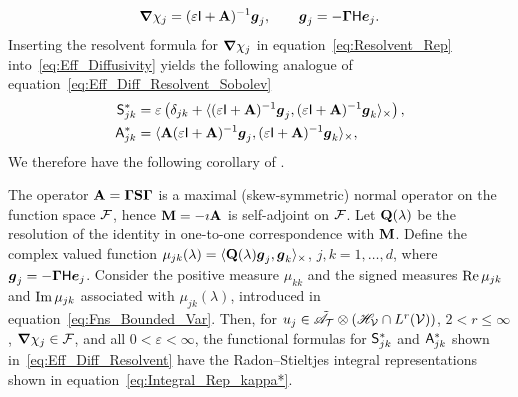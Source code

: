 \documentclass[amsa]{ipart}
\begin{document}
% 
\begin{align}\label{eq:Resolvent_Rep}
  \bnabla \chi_j=(\varepsilon\Ib+\Ab)^{-1}\vecg_j,
  \qquad
  \vecg_j=-\bGamma\Hm\vece_j.
\end{align}
%
Inserting the resolvent formula for
$\mbox{\boldmath${\nabla}$}\chi_j$ in equation~\eqref{eq:Resolvent_Rep}
into~\eqref{eq:Eff_Diffusivity} yields the following analogue 
of equation~\eqref{eq:Eff_Diff_Resolvent_Sobolev} 
%
\begin{align}\label{eq:Eff_Diff_Resolvent}
 \Sm^*_{jk}&=\varepsilon\left(\delta_{jk}+\langle(\varepsilon\Ib+\Ab)^{-1}\vecg_j,(\varepsilon\Ib+\Ab)^{-1}\vecg_k\rangle_\times\right),
 \\
 \Am^*_{jk}&=\langle\Ab(\varepsilon\Ib+\Ab)^{-1}\vecg_j,(\varepsilon\Ib+\Ab)^{-1}\vecg_k\rangle_\times,
 \notag
\end{align}
%
We therefore have the following corollary of .
%
\begin{corollary}\label{cor:Integral_Reps}
  The operator $\mathbf{A}=\mbox{\boldmath${\Gamma}$}\mathbf{S}\mbox{\boldmath${\Gamma}$}$ is a maximal (skew-symmetric)
  normal operator on the function space $\mathcal{F}$, hence $\mathbf{M}=-\imath\mathbf{A}$ is
  self-adjoint on $\mathcal{F}$. Let $\mathbf{Q}(\lambda)$ be the resolution of the
  identity in one-to-one correspondence with $\mathbf{M}$. Define the complex
  valued function $\mu_{jk}(\lambda)=\langle\mathbf{Q}(\lambda)\boldsymbol{g}_j,\boldsymbol{g}_k\rangle_\times$, $j,k=1,\ldots,d$,
  where $ \boldsymbol{g}_j=-\mbox{\boldmath${\Gamma}$}\mathsf{H}\boldsymbol{e}_j$. Consider the positive measure
  $\mu_{kk}$ and the 
  signed measures $\mbox{Re}\,\mu_{jk}$ and $\mbox{Im}\,\mu_{jk}$ associated with
  $\mu_{jk}(\lambda)$, introduced in
  equation~\eqref{eq:Fns_Bounded_Var}. Then, for
  $u_j\in\tilde{\mathscr{A}}_{\mathcal{T}}\otimes(\mathscr{H}_{\mathcal{V}}\cap L^r(\mathcal{V}))$, $2<r\leq\infty$,
  $\mbox{\boldmath${\nabla}$}\chi_j\in\mathcal{F}$, and all $0<\varepsilon<\infty$, the functional formulas for
  $\mathsf{S}^*_{jk}$ and $\mathsf{A}^*_{jk}$ shown in~\eqref{eq:Eff_Diff_Resolvent}
  have the Radon--Stieltjes integral representations shown in
  equation~\eqref{eq:Integral_Rep_kappa*}.     
% 
\end{corollary}
%
\end{document}
